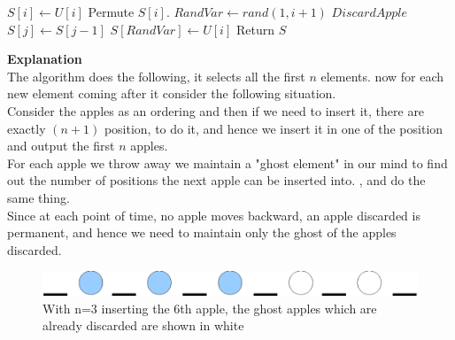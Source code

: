 \documentclass{assignment}
\begin{document}
\begin{problemlist}
\begin{problem}
\begin{answer}
\begin{algorithm}[H]                      %
\caption{$OnlineSample(U)$}         	%
\label{os}                           %
\begin{algorithmic} 
 \STATE $S[i] \leftarrow U[i]$
\ENDFOR
\STATE Permute $S[i]$.
 \STATE $RandVar \leftarrow rand(1, i+1)$
   \STATE $Discard Apple$
 \ELSE
  \STATE $S[j] \leftarrow S[j-1]$
 \ENDFOR
 \STATE $S[RandVar] \leftarrow U[i]$
 \ENDIF
 \ENDFOR
 \STATE Return $S$
\end{algorithmic}
\end{algorithm}
\textbf{Explanation} \\
The algorithm does the following, it selects all the first $n$ elements. now for each new element coming after it consider the following situation.\\
Consider the apples as an ordering and then if we need to insert it, there are exactly $(n+1)$ position, to do it, and hence we insert it in one of the position and output the first $n$ apples.\\
For each apple we throw away we maintain a "ghost element" in our mind to find out the number of positions the next apple can be inserted into. , and do the same thing. \\
Since at each point of time, no apple moves backward, an apple discarded is permanent, and hence we need to maintain only the ghost of the apples discarded. \\

\begin{figure}[H]
 \centering
 \includegraphics[scale=0.7]{os.eps}
 \caption{With n=3 inserting the 6th apple, the ghost apples which are already discarded are shown in white}
 \label{fig:os}
\end{figure}


\end{answer}
\end{problem}
\end{problemlist}
\end{document}
